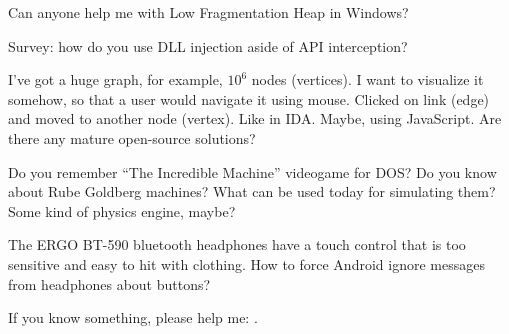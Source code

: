 \myhrule{}

Can anyone help me with Low Fragmentation Heap in Windows?

\myhrule{}

Survey: how do you use DLL injection aside of API interception?

\myhrule{}

I've got a huge graph, for example, $10^6$ nodes (vertices).
I want to visualize it somehow, so that a user would navigate it using mouse.
Clicked on link (edge) and moved to another node (vertex).
Like in IDA.
Maybe, using JavaScript.
Are there any mature open-source solutions?

\myhrule{}

Do you remember ``The Incredible Machine'' videogame for DOS?
Do you know about Rube Goldberg machines?
What can be used today for simulating them?
Some kind of physics engine, maybe?

\myhrule{}

The ERGO BT-590 bluetooth headphones have a touch control that is too sensitive and easy to hit with clothing.
How to force Android ignore messages from headphones about buttons?

\myhrule{}

If you know something, please help me: \EMAILS{}.

